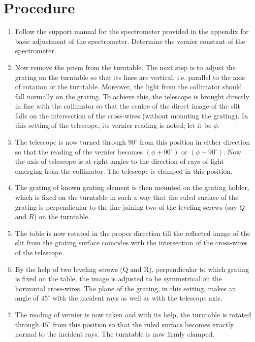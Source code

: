 \section{Procedure}

\begin{enumerate}
	\item Follow the support manual for the spectrometer provided in the appendix for basic adjustment of the spectrometer. Determine the vernier constant of the spectrometer.
	\item Now remove the prism from the turntable. The next step is to adjust the grating on the turntable so that its lines are vertical, i.e. parallel to the axis of rotation or the turntable. Moreover, the light from the collimator should fall normally on the grating. To achieve this, the telescope is brought directly in line with the collimator so that the centre of the direct image of the slit falls on the intersection of the cross-wires (without mounting the grating). In this setting of the telescope, its vernier reading is noted; let it be $\phi$.
	\item The telescope is now turned through $90^\circ$ from this position in either direction so that the reading of the vernier becomes $(\phi+90^\circ)$ or $(\phi-90^\circ)$. Now the axis of telescope is at right angles to the direction of rays of light emerging from the collimator. The telescope is clamped in this position.
	\item The  grating of known grating element is then mounted on the grating holder, which is fixed on the turntable in such a way that the ruled surface of the grating is perpendicular to the line joining two of the leveling screws (say $Q$ and $R$) on the turntable.
	\item The table is now rotated in the proper direction till the reflected image of the slit from the grating surface coincides with the intersection of the cross-wires of the telescope.
	\item By the help of two leveling screws (Q and R), perpendicular to which grating is fixed on the table, the image is adjusted to be symmetrical on the horizontal cross-wires. The plane of the grating, in this setting, makes an angle of $45^\circ$ with the incident rays as well as with the telescope axis.
	\item The reading of vernier is now taken and with its help, the turntable is rotated through $45^\circ$ from this position so that the ruled surface becomes exactly normal to the incident rays. The turntable is now firmly clamped.

\end{enumerate}
